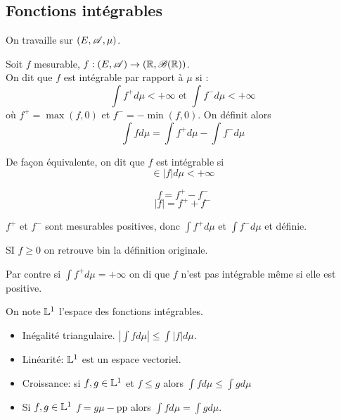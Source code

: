 \subsection{Fonctions intégrables}

On travaille sur $(E, \mathscr{A}, \mu)$.

\begin{definition}
	Soit $f$ mesurable, $f : (E, \mathscr{A}) \to (\mathbb{R}, \mathscr{B}(\mathbb{R}))$.\\
	On dit que $f$ est intégrable par rapport à $\mu$ si :
	$$\int f^+ d\mu < +\infty \text{ et } \int f^- d\mu < +\infty$$
	où $f^+ = \max(f,0)$ et $f^- = -\min(f,0)$.
	On définit alors
	$$ \int f d\mu = \int f^+ d\mu - \int f^- d\mu $$
\end{definition}

\begin{remarque}
	De façon équivalente, on dit que $f$ est intégrable si
	$$ \in |f| d\mu < +\infty$$
\end{remarque}

\begin{remarque}
	$$ f = f^+ - f^- $$
	$$ |f| = f^+ + f^- $$
\end{remarque}

\begin{remarque}
	$f^+$ et $f^-$ sont mesurables positives, donc $\int f^+d\mu$ et $\int f^- d\mu$ et définie.
\end{remarque}

\begin{remarque}
	SI $f \geq 0$ on retrouve bin la définition originale.
\end{remarque}

\begin{remarque}
	Par contre si $\int f^+ d\mu = +\infty$ on di que $f$ n'est pas intégrable même si elle est positive.
\end{remarque}


\begin{definition}
	On note $\mathbb{L}^1$ l'espace des fonctions intégrables.
\end{definition}

\begin{prop}
	\begin{itemize}
		\item Inégalité triangulaire. $\left| \int f d\mu \right| \leq \int |f| d \mu$.
		\item Linéarité: $\mathbb{L}^1$ est un espace vectoriel.
		\item Croissance: si $f,g \in \mathbb{L}^1$ et $f\leq g$ alors $\int f d\mu \leq \int g d\mu$
		\item Si $f,g \in \mathbb{L}^1$ $f = g \mu-$pp alors $\int f d\mu = \int g d\mu$.
	\end{itemize}
\end{prop}

